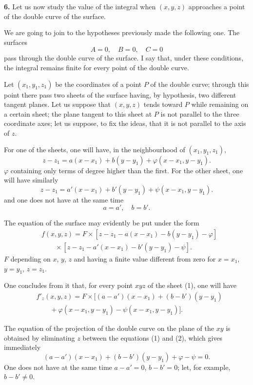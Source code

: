 \documentclass{article}
\begin{document}
\textbf{6.} Let us now study the value of the integral when $(x, y, z)$ approaches a point of the double curve of the surface.

We are going to join to the hypotheses previously made the following one. The surfaces
\[
A = 0, \quad B = 0, \quad C = 0
\]
pass through the double curve of the surface. I say that, under these conditions, the integral remains finite for every point of the double curve.

Let $(x_{1}, y_{1}, z_{1})$ be the coordinates of a point $P$ of the double curve; through this point there pass two sheets of the surface having, by hypothesis, two different tangent planes. Let us suppose that $(x, y, z)$ tends toward $P$ while remaining on a certain sheet; the plane tangent to this sheet at $P$ is not parallel to the three coordinate axes; let us suppose, to fix the ideas, that it is not parallel to the axis of $z$.

For one of the sheets, one will have, in the neighbourhood of $(x_{1}, y_{1}, z_{1})$,
\[
z - z_{1} = a(x - x_{1}) + b(y - y_{1}) + \varphi(x - x_{1}, y - y_{1}). \tag{1}
\]
$\varphi$ containing only terms of degree higher than the first.
For the other sheet, one will have similarly
\[
z - z_{1} = a'(x - x_{1}) + b'(y - y_{1}) + \psi(x - x_{1}, y - y_{1}). \tag{2}
\]
and one does not have at the same time
\[
a = a', \quad b = b'.
\]

The equation of the surface may evidently be put under the form
\[
\begin{aligned}
&f(x, y, z) = F \times [z - z_{1} - a(x - x_{1}) - b(y - y_{1}) - \varphi] \\
&\qquad \times [z - z_{1} - a'(x - x_{1}) - b'(y - y_{1}) - \psi].
\end{aligned}
\]
$F$ depending on $x$, $y$, $z$ and having a finite value different from zero for $x = x_{1}$, $y = y_{1}$, $z = z_{1}$.

One concludes from it that, for every point $xyz$ of the sheet (1), one will have
\[
\begin{aligned}
&f'_{z}(x, y, z) = F \times [(a - a')(x - x_{1}) + (b - b')(y - y_{1}) \\
&\qquad + \varphi(x - x_{1}, y - y_{1}) - \psi(x - x_{1}, y - y_{1})].
\end{aligned}
\]

The equation of the projection of the double curve on the plane of the $xy$ is obtained by eliminating $z$ between the equations (1) and (2), which gives immediately
\[
(a - a')(x - x_{1}) + (b - b')(y - y_{1}) + \varphi - \psi = 0. \tag{3}
\]
One does not have at the same time $a - a' = 0$, $b - b' = 0$; let, for example, $b - b' \neq 0$.
\end{document}
